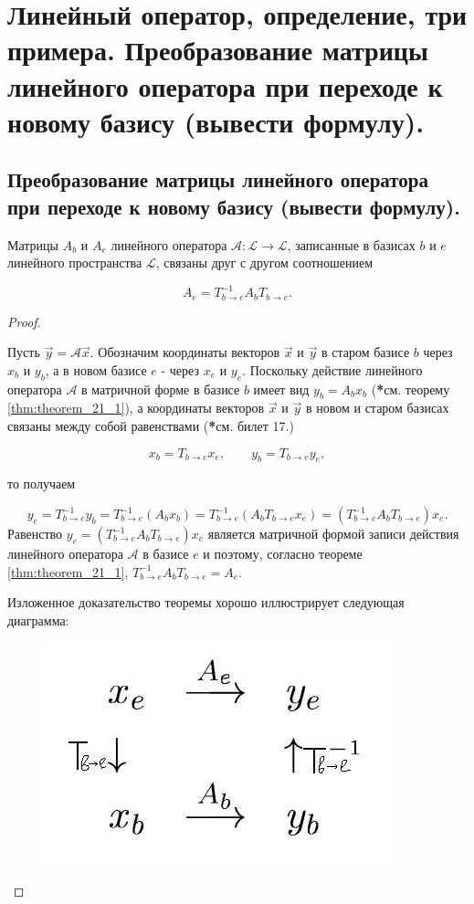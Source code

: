 \section{
    Линейный оператор, определение, три примера. Преобразование матрицы линейного оператора при переходе к новому базису (вывести формулу).
 }

\subsection{
    Преобразование матрицы линейного оператора при переходе к новому базису (вывести формулу).
}

\begin{theorem}
    Матрицы $A_b$ и $A_e$ линейного оператора $\mathscr{A} \colon \mathcal{L} \to \mathcal{L}$, записанные в базисах $b$ и $e$ линейного пространства $\mathcal{L}$, связаны друг с другом соотношением
    
    $$A_e = T^{-1}_{b \to e}A_bT_{b \to e}.$$
\end{theorem}

\begin{proof}~

    Пусть $\vec{y} = \mathscr{A}\vec{x}$. Обозначим координаты векторов $\vec{x}$ и $\vec{y}$ в старом базисе $b$ через $x_b$ и $y_b$, а в новом базисе $e$ - через $x_e$ и $y_e$. Поскольку действие линейного оператора $\mathscr{A}$ в матричной форме в базисе $b$ имеет вид $y_b = A_bx_b$ (\textbf{*}см. теорему \ref{thm:theorem_21_1}), а координаты векторов $\vec{x}$ и $\vec{y}$ в новом и старом базисах связаны между собой равенствами (\textbf{*}см. билет 17.)

    $$x_b = T_{b \to e}x_e, \quad \quad y_b = T_{b \to e}y_e,$$

    то получаем

    $$y_e = T^{-1}_{b \to e}y_b = T^{-1}_{b \to e}(A_bx_b) = T^{-1}_{b \to e}(A_bT_{b \to e}x_e) = (T^{-1}_{b \to e}A_bT_{b \to e})x_e.$$
    Равенство $y_e = (T^{-1}_{b \to e}A_bT_{b \to e})x_e$ является матричной формой записи действия линейного оператора $\mathscr{A}$ в базисе $e$ и поэтому, согласно теореме \ref{thm:theorem_21_1}, $T^{-1}_{b \to e}A_bT_{b \to e} = A_e$. 

    Изложенное доказательство теоремы хорошо иллюстрирует следующая диаграмма:

    \begin{figure}[H]
        \centering
        \includegraphics[scale=0.5]{images/22_1.jpg}
        \label{fig:picture_22_1}
    \end{figure}
\end{proof}